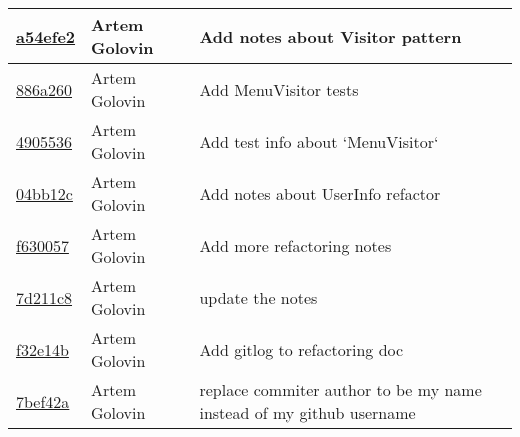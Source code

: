 \begin{tabularx}{\textwidth}{l l X}
\href{https://github.com/awave1/assessment-loan-system/commit/a54efe2612111bb5b273db3377973cb740a51d55}{a54efe2} & Artem Golovin & Add notes about Visitor pattern\\ \hline
\href{https://github.com/awave1/assessment-loan-system/commit/886a2605f749282f45e9ef8c3c4cbe1762a68799}{886a260} & Artem Golovin & Add MenuVisitor tests\\ \hline
\href{https://github.com/awave1/assessment-loan-system/commit/490553677b59d77926ab6a3eee321a2cc350be1f}{4905536} & Artem Golovin & Add test info about `MenuVisitor`\\ \hline
\href{https://github.com/awave1/assessment-loan-system/commit/04bb12ca11d0e76f57607a9481ea5954787117b0}{04bb12c} & Artem Golovin & Add notes about UserInfo refactor\\ \hline
\href{https://github.com/awave1/assessment-loan-system/commit/f630057ca876e3222e614dc4797ef0cf1399c42d}{f630057} & Artem Golovin & Add more refactoring notes\\ \hline
\href{https://github.com/awave1/assessment-loan-system/commit/7d211c8d1556f10a63d8a0dcc3697ce279695a29}{7d211c8} & Artem Golovin & update the notes\\ \hline
\href{https://github.com/awave1/assessment-loan-system/commit/f32e14bad9c46a5fedc7f3564c868cbc29ee74f2}{f32e14b} & Artem Golovin & Add gitlog to refactoring doc\\ \hline
\href{https://github.com/awave1/assessment-loan-system/commit/7bef42a766618e5eda54960d929c7182e1cacbe4}{7bef42a} & Artem Golovin & replace commiter author to be my name instead of my github username\\ \hline
\end{tabularx}
